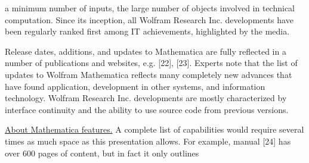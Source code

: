 \documentclass{article}
\begin{document}
\begin{multicols}{2}
a minimum number of inputs, the large number of
objects involved in technical computation. Since its
inception, all Wolfram Research Inc. developments have
been regularly ranked first among IT achievements,
highlighted by the media.
\par
Release dates, additions, and updates to Mathematica
are fully reflected in a number of publications and
websites, e.g. [22], [23]. Experts note that the list of updates to Wolfram Mathematica reflects many completely
new advances that have found application, development
in other systems, and information technology. Wolfram
Research Inc. developments are mostly characterized by
interface continuity and the ability to use source code
from previous versions.
\par
\underline{About Mathematica features.} A complete list of capabilities would require several times as much space as
this presentation allows. For example, manual [24] has
over 600 pages of content, but in fact it only outlines
\end{multicols}
\end{document}
